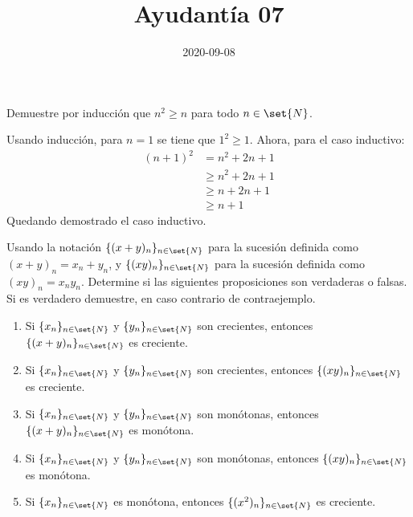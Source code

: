 \documentclass{ayudantia}
\title{Ayudantía 07}
\date{2020-09-08}
\begin{document}
\maketitle

\begin{prob}
    Demuestre por inducción que \(n^2\geq n\) para todo \(n\in\set{N}\).
\end{prob}

\begin{ans}
    \begin{sol}
        Usando inducción, para \(n=1\) se tiene que \(1^2\geq 1\). Ahora, para el caso inductivo:
        \begin{align*}
            (n+1)^2&=n^2+2n+1\\
            &\geq n^2+2n+1\\
            &\geq n+2n+1\\
            &\geq n+1
        \end{align*}
        Quedando demostrado el caso inductivo.
    \end{sol}
\end{ans}


\begin{prob}
    Usando la notación \(\{(x+y)_n\}_{n\in\set{N}}\) para la sucesión definida como \((x+y)_n=x_n+y_n\), y \(\{(xy)_n\}_{n\in\set{N}}\) para la sucesión definida como \((xy)_n=x_ny_n\). Determine si las siguientes proposiciones son verdaderas o falsas. Si es verdadero demuestre, en caso contrario de contraejemplo.
    \begin{enumerate}
        \item Si \(\{x_n\}_{n\in\set{N}}\) y \(\{y_n\}_{n\in\set{N}}\) son crecientes, entonces \(\{(x+y)_n\}_{n\in\set{N}}\) es creciente.
        \item Si \(\{x_n\}_{n\in\set{N}}\) y \(\{y_n\}_{n\in\set{N}}\) son crecientes, entonces \(\{(xy)_n\}_{n\in\set{N}}\) es creciente.
        \item Si \(\{x_n\}_{n\in\set{N}}\) y \(\{y_n\}_{n\in\set{N}}\) son monótonas, entonces \(\{(x+y)_n\}_{n\in\set{N}}\) es monótona.
        \item Si \(\{x_n\}_{n\in\set{N}}\) y \(\{y_n\}_{n\in\set{N}}\) son monótonas, entonces \(\{(xy)_n\}_{n\in\set{N}}\) es monótona.
        \item Si \(\{x_n\}_{n\in\set{N}}\) es monótona, entonces \(\{(x^2)_n\}_{n\in\set{N}}\) es creciente.
    \end{enumerate}
\end{prob}
\end{document}
